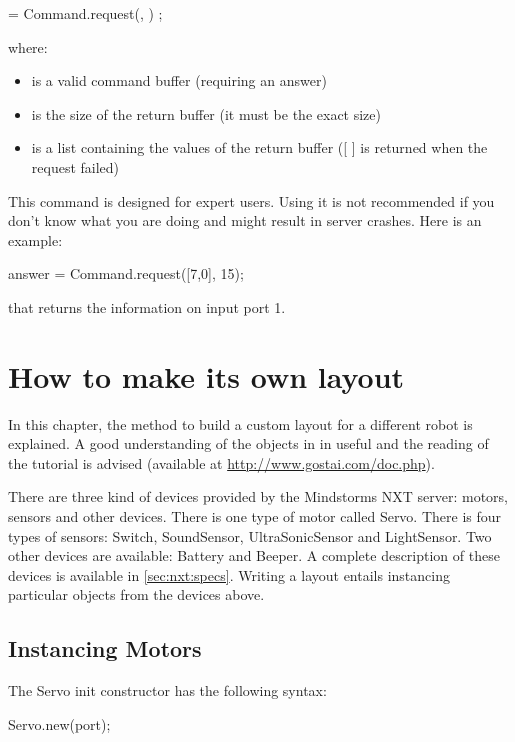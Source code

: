 \begin{urbiunchecked}
 = Command.request(, ) ;
\end{urbiunchecked}

where:
\begin{itemize}
\item {} is a valid command buffer (requiring an answer)
\item {} is the size of the return buffer (it must be the exact
  size)
\item {} is a list containing the values of the return buffer ([ ]
  is returned when the request failed)
\end{itemize}

This command is designed for expert users. Using it is not recommended if you
don't know what you are doing and might result in server crashes.
Here is an example:
\begin{urbiunchecked}
answer = Command.request([7,0], 15);
\end{urbiunchecked}

that returns the information on input port 1.

\section{How to make its own layout}

In this chapter, the method to build a custom layout for a different robot
is explained. A good understanding of the objects in \urbi in useful and the
reading of the \urbi tutorial is advised (available at
\url{http://www.gostai.com/doc.php}).

There are three kind of devices provided by the Mindstorms NXT server:
motors, sensors and other devices. There is one type of motor called
Servo. There is four types of sensors: Switch, SoundSensor, UltraSonicSensor
and LightSensor. Two other devices are available: Battery and Beeper. A
complete description of these devices is available in
\autoref{sec:nxt:specs}.  Writing a layout entails instancing particular
objects from the devices above.

\subsection{Instancing Motors}
The Servo init constructor has the following syntax:
\begin{urbiunchecked}
Servo.new(port);
\end{urbiunchecked}

